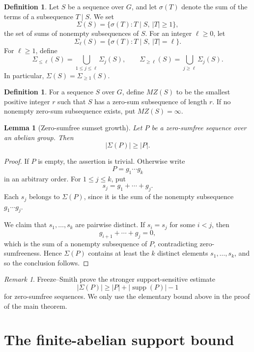 \documentclass[12pt,reqno]{amsart}
\newtheorem{lemma}[theorem]{Lemma}
\theoremstyle{definition}
\newtheorem{definition}[theorem]{Definition}
\theoremstyle{remark}
\newtheorem{remark}[theorem]{Remark}
\DeclareMathOperator{\supp}{supp}
\begin{document}
\begin{definition}\label{def:subsequence-sums}
Let $S$ be a sequence over $G$, and let $\sigma(T)$ denote the sum of the terms of a subsequence $T\mid S$.  We set
\[
  \Sigma(S)=\{\sigma(T):T\mid S,\ |T|\ge 1\},
\]
the set of sums of nonempty subsequences of $S$.  For an integer $\ell\ge 0$, let
\[
  \Sigma_\ell(S)=\{\sigma(T):T\mid S,\ |T|=\ell\}.
\]
For $\ell\ge 1$, define
\[
  \Sigma_{\leq \ell}(S)=\bigcup_{1\le j\le \ell}\Sigma_j(S),
  \qquad
  \Sigma_{\geq \ell}(S)=\bigcup_{j\ge \ell}\Sigma_j(S).
\]
In particular, $\Sigma(S)=\Sigma_{\geq 1}(S)$.
\end{definition}

\begin{definition}\label{def:shortest-zero-sum-length}
For a sequence $S$ over $G$, define $MZ(S)$ to be the smallest positive integer $r$ such that $S$ has a zero-sum subsequence of length $r$.  If no nonempty zero-sum subsequence exists, put $MZ(S)=\infty$.
\end{definition}

\begin{lemma}[Zero-sumfree sumset growth]\label{lem:sumset-growth}
Let $P$ be a zero-sumfree sequence over an abelian group.  Then
\[
  |\Sigma(P)|\ge |P|.
\]
\end{lemma}

\begin{proof}
If $P$ is empty, the assertion is trivial.  Otherwise write
\[
  P=g_1\cdots g_k
\]
in an arbitrary order.  For $1\le j\le k$, put
\[
  s_j=g_1+\cdots+g_j.
\]
Each $s_j$ belongs to $\Sigma(P)$, since it is the sum of the nonempty subsequence $g_1\cdots g_j$.

We claim that $s_1,\ldots,s_k$ are pairwise distinct.  If $s_i=s_j$ for some $i<j$, then
\[
  g_{i+1}+\cdots+g_j=0,
\]
which is the sum of a nonempty subsequence of $P$, contradicting zero-sumfreeness.  Hence $\Sigma(P)$ contains at least the $k$ distinct elements $s_1,\ldots,s_k$, and so the conclusion follows.
\end{proof}

\begin{remark}\label{rem:freeze-smith-bound}
Freeze--Smith prove the stronger support-sensitive estimate
\[
  |\Sigma(P)|\ge |P|+|\supp(P)|-1
\]
for zero-sumfree sequences.  We only use the elementary bound above in the proof of the main theorem.
\end{remark}

\section{The finite-abelian support bound}
\end{document}
